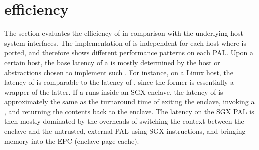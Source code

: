 \section{\Thehostabi{} efficiency}





The section evaluates the efficiency of \thehostabi{} in comparison with
the underlying host system interfaces.
The implementation of \thehostabi{} is independent
for each host where \graphene{} is ported,
and therefore shows different
performance patterns on each PAL.
Upon a certain host, the base latency of a \hostapi{} is mostly determined by the host \linuxapis{} or abstractions
chosen to implement such \hostapi{}.
For instance, on a Linux host, the latency of  is comparable to the latency of ,
since the former is essentially
a wrapper of the latter.
If a \picoproc{} runs inside an SGX enclave,
the latency of  is approximately the same as the turnaround time of exiting the enclave,
invoking a  \linuxapi{}, and returning the contents back to the enclave.
The latency on the SGX PAL is then mostly dominated by the overheads
of switching the context between the enclave
and the untrusted, external PAL using SGX instructions,
and bringing memory into the EPC (enclave page cache).



